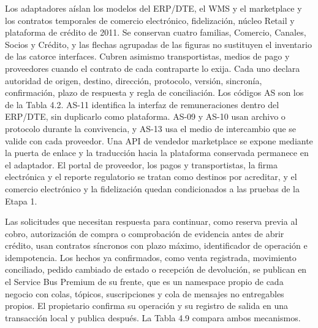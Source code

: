\documentclass[11pt]{article}
\begin{document}
Los adaptadores aíslan los modelos del ERP/DTE, el WMS y el marketplace y los contratos temporales de comercio electrónico, fidelización, núcleo Retail y plataforma de crédito de 2011. Se conservan cuatro familias, Comercio, Canales, Socios y Crédito, y las flechas agrupadas de las figuras no sustituyen el inventario de las catorce interfaces. Cubren asimismo transportistas, medios de pago y proveedores cuando el contrato de cada contraparte lo exija. Cada uno declara autoridad de origen, destino, dirección, protocolo, versión, sincronía, confirmación, plazo de respuesta y regla de conciliación. Los códigos AS son los de la Tabla 4.2. AS-11 identifica la interfaz de remuneraciones dentro del ERP/DTE, sin duplicarlo como plataforma. AS-09 y AS-10 usan archivo o protocolo durante la convivencia, y AS-13 usa el medio de intercambio que se valide con cada proveedor. Una API de vendedor marketplace se expone mediante la puerta de enlace y la traducción hacia la plataforma conservada permanece en el adaptador. El portal de proveedor, los pagos y transportistas, la firma electrónica y el reporte regulatorio se tratan como destinos por acreditar, y el comercio electrónico y la fidelización quedan condicionados a las pruebas de la Etapa 1.

Las solicitudes que necesitan respuesta para continuar, como reserva previa al cobro, autorización de compra o comprobación de evidencia antes de abrir crédito, usan contratos síncronos con plazo máximo, identificador de operación e idempotencia. Los hechos ya confirmados, como venta registrada, movimiento conciliado, pedido cambiado de estado o recepción de devolución, se publican en el Service Bus Premium de su frente, que es un namespace propio de cada negocio con colas, tópicos, suscripciones y cola de mensajes no entregables propios. El propietario confirma su operación y su registro de salida en una transacción local y publica después. La Tabla 4.9 compara ambos mecanismos.

\par\vspace{0pt plus 10\baselineskip}\vspace{0pt plus -10\baselineskip}
\end{document}
